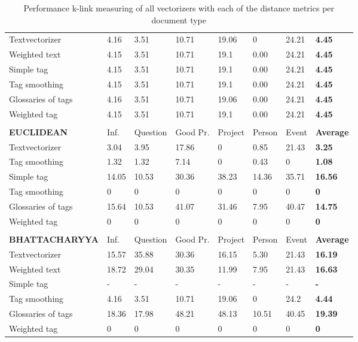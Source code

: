\begin{table}
\begin{tabular}{| l | l | l | l | l | l | l | l |}
\hline
Textvectorizer & 4.16 & 3.51 & 10.71 & 19.06 & 0 & 24.21 & {\bf 4.45} \\ 
Weighted text & 4.15 & 3.51 & 10.71 & 19.1 & 0.00 & 24.21 & {\bf 4.45} \\ 
Simple tag & 4.15 & 3.51 & 10.71 & 19.1 & 0.00 & 24.21 & {\bf 4.45} \\ 
Tag smoothing & 4.15 & 3.51 & 10.71 & 19.1 & 0.00 & 24.21 & {\bf 4.45} \\ 
Glossaries of tags & 4.16 & 3.51 & 10.71 & 19.06 & 0.00 & 24.21 & {\bf 4.45} \\ 
Weighted tag & 4.15 & 3.51 & 10.71 & 19.1 & 0.00 & 24.21 & {\bf 4.45} \\ 
\hline
\\
\hline
{\bf EUCLIDEAN} & Inf. &  Question &  Good Pr.& Project & Person &  Event & {\bf Average} \\
\hline
Textvectorizer & 3.04 & 3.95 & 17.86 & 0 & 0.85 & 21.43 & {\bf 3.25} \\ 
Tag smoothing & 1.32 & 1.32 & 7.14 & 0 & 0.43 & 0 & {\bf 1.08} \\ 
Simple tag & 14.05 & 10.53  & 30.36 & 38.23 & 14.36 & 35.71 & {\bf 16.56} \\ 
Tag smoothing & 0 & 0 & 0 & 0 & 0 & 0 & {\bf 0} \\ 
Glossaries of tags & 15.64 & 10.53 & 41.07 & 31.46 & 7.95 & 40.47 & {\bf 14.75} \\ 
Weighted tag & 0 & 0 & 0 & 0 & 0 & 0 & {\bf 0} \\ 
\hline
\\
\hline
{\bf BHATTACHARYYA} & Inf. &  Question &  Good Pr.& Project & Person &  Event & {\bf Average} \\
\hline
Textvectorizer & 15.57 & 35.88 & 30.36 & 16.15 & 5.30 & 21.43 & {\bf 16.19} \\ 
Weighted text & 18.72 & 29.04 & 30.35 & 11.99 & 7.95 & 21.43 & {\bf 16.63} \\ 
Simple tag & - & - & - & - & - & - & {\bf -} \\ 
Tag smoothing & 4.16 & 3.51 & 10.71 & 19.06 & 0 & 24.2 & {\bf 4.44} \\ 
Glossaries of tags & 18.36 & 17.98 & 48.21 & 48.13 & 10.51 & 40.45 & {\bf 19.39} \\ 
Weighted tag & 0 & 0 & 0 & 0 & 0 & 0 & {\bf 0} \\ 
\hline
\end{tabular}

\caption{Performance k-link measuring of all vectorizers with each of the distance metrics per document type}
\label{klink}
\end{table}

